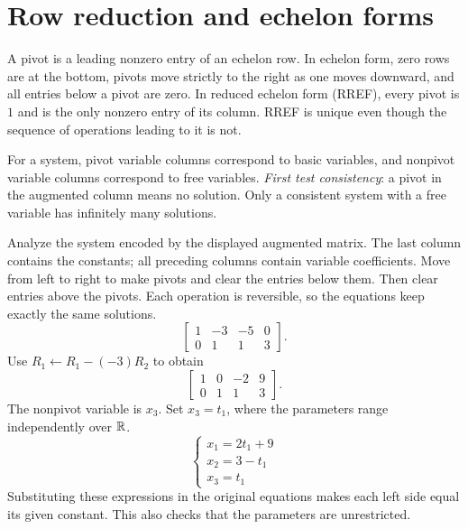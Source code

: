 \section{Row reduction and echelon forms}
A pivot is a leading nonzero entry of an echelon row. In echelon form,
zero rows are at the bottom, pivots move strictly to the right as one moves
downward, and all entries below a pivot are zero. In reduced echelon form
(RREF), every pivot is $1$ and is the only nonzero entry of its column.
RREF is unique even though the sequence of operations leading to it is not.

For a system, pivot variable columns correspond to basic variables, and
nonpivot variable columns correspond to free variables. \emph{First test
consistency}: a pivot in the augmented column means no solution. Only a
consistent system with a free variable has infinitely many solutions.

\goal Analyze the system encoded by the displayed augmented matrix. The last column contains the constants; all preceding columns contain variable coefficients.
\idea Move from left to right to make pivots and clear the entries below them. Then clear entries above the pivots. Each operation is reversible, so the equations keep exactly the same solutions.
\[ \left[\begin{array}{rrr|r}1&-3&-5&0\\0&1&1&3\end{array}\right].\]
Use $R_{1}\leftarrow R_{1}-(-3)R_{2}$ to obtain
\[ \left[\begin{array}{rrr|r}1&0&-2&9\\0&1&1&3\end{array}\right].\]
The nonpivot variable is $x_{3}$. Set $x_{3}=t_{1}$, where the parameters range independently over $\mathbb{R}$.
\[ \begin{cases}x_{1}=2 t_{1} + 9\\x_{2}=3 - t_{1}\\x_{3}=t_{1}\end{cases}\]
Substituting these expressions in the original equations makes each left side equal its given constant. This also checks that the parameters are unrestricted.

